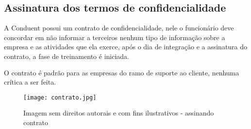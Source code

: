 \documentclass[12pt]{article}
\begin{document}
\newpage
\subsection{Assinatura dos termos de confidencialidade}

A Conduent possui um contrato de confidencialidade, nele o funcionário deve concordar em não informar a terceiros nenhum tipo de informação sobre a empresa e as atividades que ela exerce, após o dia de integração e a assinatura do contrato, a fase de treinamento é iniciada.

O contrato é padrão para as empresas do ramo de suporte ao cliente, nenhuma crítica a ser feita.

\begin{figure}[h]
	\centering
	\texttt{[image: contrato.jpg]}
	\caption{Imagem sem direitos autorais e com fins ilustrativos - assinando contrato}
	\label{fig:mesh1}
\end{figure}
\end{document}

